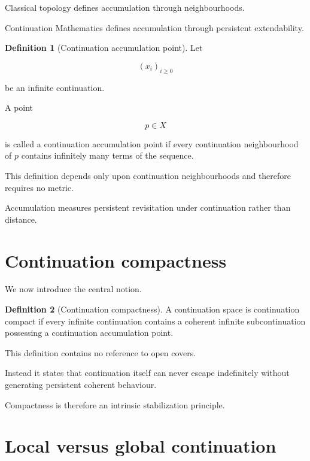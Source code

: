 \documentclass[13pt,openany]{book}
\theoremstyle{plain}
\theoremstyle{definition}
\newtheorem{definition}{Definition}[chapter]
\begin{document}
Classical topology defines accumulation through neighbourhoods.

Continuation Mathematics defines accumulation through persistent
extendability.

\begin{definition}[Continuation accumulation point]
Let

\[
(x_i)_{i\ge0}
\]

be an infinite continuation.

A point

\[
p\in X
\]

is called a continuation accumulation point if every continuation neighbourhood
of $p$ contains infinitely many terms of the sequence.
\end{definition}

This definition depends only upon continuation neighbourhoods and therefore
requires no metric.

Accumulation measures persistent revisitation under continuation rather than
distance.

\section{Continuation compactness}

We now introduce the central notion.

\begin{definition}[Continuation compactness]
A continuation space is continuation compact if every infinite continuation
contains a coherent infinite subcontinuation possessing a continuation
accumulation point.
\end{definition}

This definition contains no reference to open covers.

Instead it states that continuation itself can never escape indefinitely without
generating persistent coherent behaviour.

Compactness is therefore an intrinsic stabilization principle.

\section{Local versus global continuation}
\end{document}
